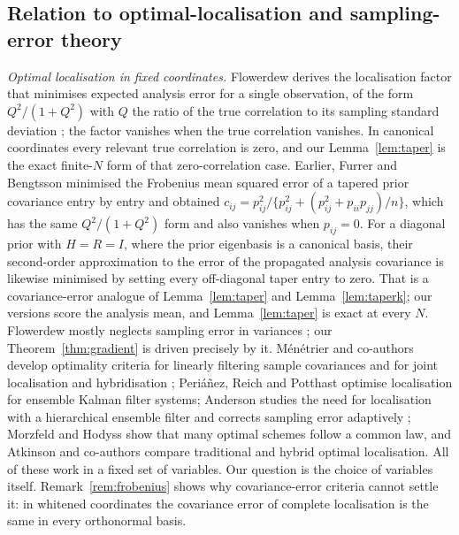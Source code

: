 \documentclass[11pt,a4paper]{article}
\numberwithin{equation}{section}
\theoremstyle{remark}\newtheorem{remark}[theorem]{Remark}
\begin{document}
\subsection{Relation to optimal-localisation and sampling-error theory}\label{sec:relation}

\emph{Optimal localisation in fixed coordinates.} Flowerdew \cite{Flowerdew2015} derives
the localisation factor that minimises expected analysis error for a single observation,
of the form \(Q^2/(1+Q^2)\) with \(Q\) the ratio of the true correlation to its sampling
standard deviation \cite[Section~2]{Flowerdew2015}; the factor vanishes when the true
correlation vanishes. In canonical coordinates every relevant true correlation is zero, and
our Lemma~\ref{lem:taper} is the exact finite-\(N\) form of that zero-correlation case.
Earlier, Furrer and Bengtsson \cite[Eq.~(20)]{FurrerBengtsson2007} minimised the Frobenius
mean squared error of a tapered prior covariance entry by entry and obtained
\(c_{ij}=p_{ij}^2/\{p_{ij}^2+(p_{ij}^2+p_{ii}p_{jj})/n\}\), which has the same \(Q^2/(1+Q^2)\) form
and also vanishes when \(p_{ij}=0\). For a diagonal prior with \(H=R=I\), where the prior
eigenbasis is a canonical basis, their second-order approximation to the error of the propagated
analysis covariance \cite[Eq.~(17)]{FurrerBengtsson2007} is likewise minimised by setting every
off-diagonal taper entry to zero. That is a covariance-error analogue of Lemma~\ref{lem:taper} and
Lemma~\ref{lem:taperk}; our versions score the analysis mean, and Lemma~\ref{lem:taper} is exact at
every \(N\).
Flowerdew mostly neglects sampling error in variances \cite[Section~2.2]{Flowerdew2015}; our
Theorem~\ref{thm:gradient} is driven precisely by it. Ménétrier and co-authors develop
optimality criteria for linearly filtering sample covariances
\cite{Menetrier2015a,Menetrier2015b} and for joint localisation and hybridisation
\cite{MenetrierAuligne2015}; Periáñez, Reich and Potthast \cite{Perianez2014} optimise
localisation for ensemble Kalman filter systems; Anderson studies the need for localisation
with a hierarchical ensemble filter \cite{Anderson2007} and corrects sampling error
adaptively \cite{Anderson2012}; Morzfeld and Hodyss \cite{MorzfeldHodyss2023} show that
many optimal schemes follow a common law, and Atkinson and co-authors \cite{Atkinson2024}
compare traditional and hybrid optimal localisation. All of these work in a fixed set of
variables. Our question is the choice of variables itself. Remark~\ref{rem:frobenius}
shows why covariance-error criteria cannot settle it: in whitened coordinates the
covariance error of complete localisation is the same in every orthonormal basis.
\end{document}
